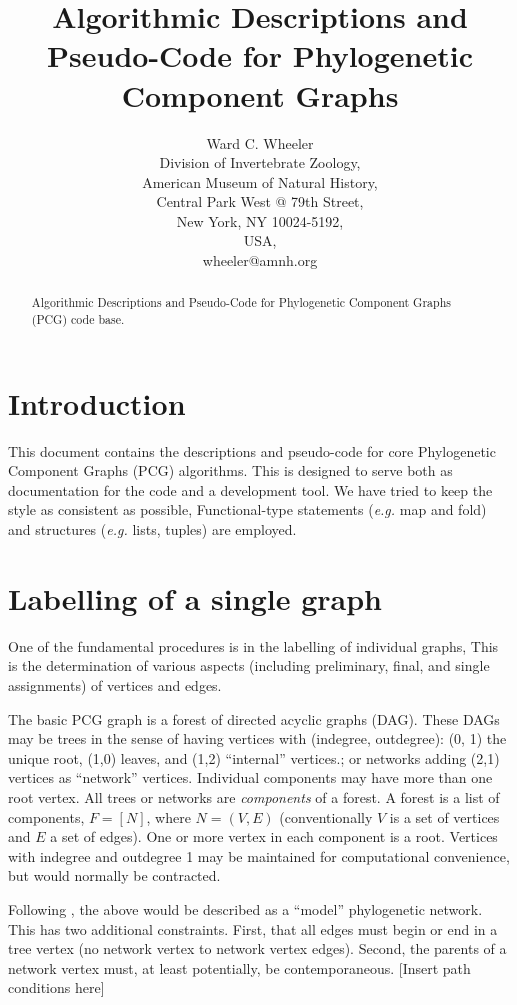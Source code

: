 \documentclass[11pt]{article}
\title{Algorithmic Descriptions and Pseudo-Code for Phylogenetic Component Graphs}
\author{Ward C. Wheeler\\
		Division of Invertebrate Zoology,\\
		American Museum of Natural History,\\
		Central Park West @ 79th Street,\\
		New York, NY 10024-5192,\\
		USA,\\
		wheeler@amnh.org}
\begin{document}
\maketitle
\begin{abstract}
	Algorithmic Descriptions and Pseudo-Code for Phylogenetic Component Graphs (PCG) code base.
\end{abstract}

\section{Introduction}
This document contains the descriptions and pseudo-code for core  Phylogenetic Component Graphs (PCG)
algorithms.  This is designed to serve both as documentation for the code and a development tool.  We have tried to keep
the style as consistent as possible,  Functional-type statements (\textit{e.g.} map and fold) and structures (\textit{e.g.} lists, tuples)
are employed.

\section{Labelling of a single graph}
One of the fundamental procedures is in the labelling of individual graphs,  This is the determination of various 
aspects (including preliminary, final, and single assignments) of vertices and edges.   

The basic PCG graph is a forest of directed acyclic graphs (DAG).  These DAGs may be trees in the sense of having
 vertices with (indegree, outdegree): (0, 1) the unique root, (1,0) leaves, and (1,2) ``internal'' vertices.; or
 networks adding (2,1) vertices as ``network'' vertices.  Individual components may have more than one 
 root vertex.   All trees or networks are \textit{components} of a forest.  A forest
 is a list of components,
 $F = [N]$, where $N = (V, E)$ (conventionally $V$ is a set of vertices and $E$ a set of edges).  One or more vertex in each component is a root.
 Vertices with indegree and outdegree 1 may be maintained for computational convenience, but would normally be contracted.
 
 Following \cite{moretetal2004}, the above would be described as a ``model'' phylogenetic network. This has two additional constraints.
 First, that all edges must begin or end in a tree vertex (no network vertex to network vertex edges).  
 Second,  the parents of a network vertex must, at least potentially, be 
 contemporaneous. [Insert path conditions here]  
 
\end{document}
